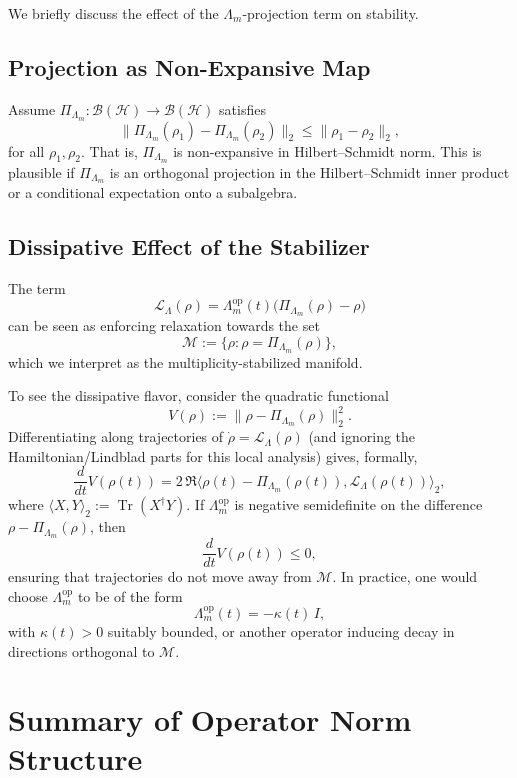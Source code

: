 \documentclass[11pt]{article}
\begin{document}
We briefly discuss the effect of the \(\Lambda_m\)-projection term on stability.

\subsection{Projection as Non-Expansive Map}

Assume \(\Pi_{\Lambda_m}\colon \mathcal{B}(\mathcal{H}) \to \mathcal{B}(\mathcal{H})\) satisfies
\[
\|\Pi_{\Lambda_m}(\rho_1) - \Pi_{\Lambda_m}(\rho_2)\|_2
\le \|\rho_1 - \rho_2\|_2,
\]
for all \(\rho_1,\rho_2\). That is, \(\Pi_{\Lambda_m}\) is non-expansive in Hilbert--Schmidt norm. This is plausible if \(\Pi_{\Lambda_m}\) is an orthogonal projection in the Hilbert--Schmidt inner product or a conditional expectation onto a subalgebra.

\subsection{Dissipative Effect of the Stabilizer}

The term
\[
\mathcal{L}_{\Lambda}(\rho)
= \Lambda_m^{\mathrm{op}}(t)\bigl(\Pi_{\Lambda_m}(\rho) - \rho\bigr)
\]
can be seen as enforcing relaxation towards the set
\[
\mathcal{M} := \{\rho \colon \rho = \Pi_{\Lambda_m}(\rho)\},
\]
which we interpret as the multiplicity-stabilized manifold.

To see the dissipative flavor, consider the quadratic functional
\[
V(\rho) := \|\rho - \Pi_{\Lambda_m}(\rho)\|_2^2.
\]
Differentiating along trajectories of \(\dot{\rho} = \mathcal{L}_{\Lambda}(\rho)\) (and ignoring the Hamiltonian/Lindblad parts for this local analysis) gives, formally,
\[
\frac{d}{dt} V(\rho(t))
= 2\,\Re\bigl\langle \rho(t) - \Pi_{\Lambda_m}(\rho(t)),
   \mathcal{L}_{\Lambda}(\rho(t)) \bigr\rangle_2,
\]
where \(\langle X, Y\rangle_2 := \operatorname{Tr}(X^\dagger Y)\). If \(\Lambda_m^{\mathrm{op}}\) is negative semidefinite on the difference \(\rho - \Pi_{\Lambda_m}(\rho)\), then
\[
\frac{d}{dt} V(\rho(t)) \le 0,
\]
ensuring that trajectories do not move away from \(\mathcal{M}\). In practice, one would choose \(\Lambda_m^{\mathrm{op}}\) to be of the form
\[
\Lambda_m^{\mathrm{op}}(t) = -\kappa(t)\,I,
\]
with \(\kappa(t) > 0\) suitably bounded, or another operator inducing decay in directions orthogonal to \(\mathcal{M}\).

\section{Summary of Operator Norm Structure}
\end{document}
